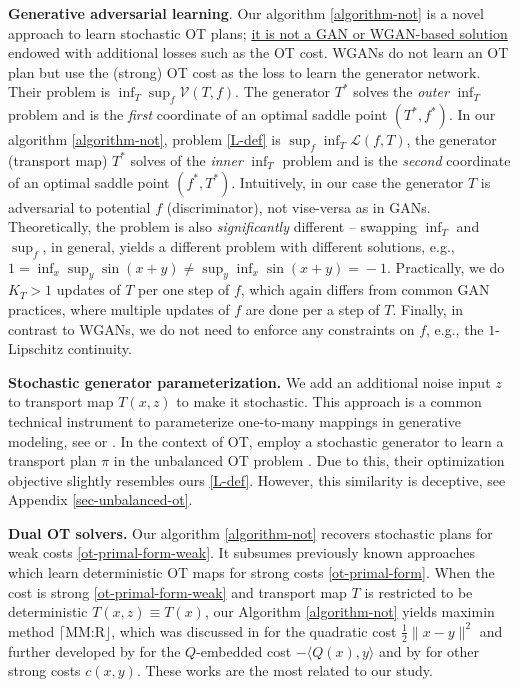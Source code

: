 \documentclass{article} %
\begin{document}
\vspace{-1.5mm}\textbf{Generative adversarial learning}. Our algorithm \ref{algorithm-not} is a novel approach to learn stochastic OT plans; \underline{it is not a GAN or WGAN-based solution}  endowed with additional losses such as the OT cost.
WGANs \citep{arjovsky2017wasserstein} do not learn an OT plan but use the (strong) OT cost as the loss to learn the generator network. Their problem is $\inf_{T}\sup_{f}\mathcal{V}(T,f)$. The generator $T^{*}$ solves the \textit{outer} $\inf_{T}$ problem and is the \textit{first} coordinate of an optimal saddle point $(T^{*},f^{*})$. In our algorithm \ref{algorithm-not}, problem \eqref{L-def} is $\sup_{f}\inf_{T}\mathcal{L}(f,T)$, the generator (transport map) $T^{*}$ solves of the \textit{inner} $\inf_{T}$ problem and is the \textit{second} coordinate of an optimal saddle point $(f^{*},T^{*})$. Intuitively, in our case the generator $T$ is adversarial to potential $f$ (discriminator), not vise-versa as in GANs. Theoretically, the problem is also \textit{significantly} different -- swapping $\inf_{T}$ and $\sup_{f}$, in general, yields a different problem with different solutions, e.g., $1\!=\!\inf_x \sup_y \sin(x\!+\!y)\!\neq\! \sup_y \inf_x \sin(x\!+\!y)\!=\!-\!1$. Practically, we do $K_{T}>1$ updates of $T$ per one step of $f$, which again differs from common GAN practices, where multiple updates of $f$ are done per a step of $T$. Finally, in contrast to WGANs, we do not need to enforce any constraints on $f$, e.g., the $1$-Lipschitz continuity. 

\textbf{Stochastic generator parameterization.} We add an additional noise input $z$ to transport map $T(x,z)$ to make it stochastic. This approach is a common technical instrument to parameterize one-to-many mappings in generative modeling, see \citep[]{almahairi2018augmented} or \citep[]{zhu2017toward}. In the context of OT, \citep{yang2018scalable} employ a stochastic generator to learn a transport plan $\pi$ in the unbalanced OT problem \citep{chizat2017unbalanced}. Due to this, their optimization objective slightly resembles ours \eqref{L-def}. However, this similarity is deceptive, see Appendix \ref{sec-unbalanced-ot}. 

\textbf{Dual OT solvers.} Our algorithm \ref{algorithm-not} recovers stochastic plans for weak costs \eqref{ot-primal-form-weak}. It subsumes previously known approaches which learn deterministic OT maps for strong costs \eqref{ot-primal-form}. When the cost is strong \eqref{ot-primal-form-weak} and transport map $T$ is restricted to be deterministic ${T(x,z)\equiv T(x)}$, our Algorithm \ref{algorithm-not} yields maximin method $\lceil \text{MM:R}\rfloor$, which was  discussed in \citep[]{korotin2021neural} for the quadratic cost ${\frac{1}{2}\|x-y\|^{2}}$ and further developed  by \citep{rout2022generative} for the $Q$-embedded cost ${-\langle Q(x),y\rangle}$ and by \citep{fan2022scalable} for other strong costs $c(x,y)$. These works are the most related to our study.
\end{document}
